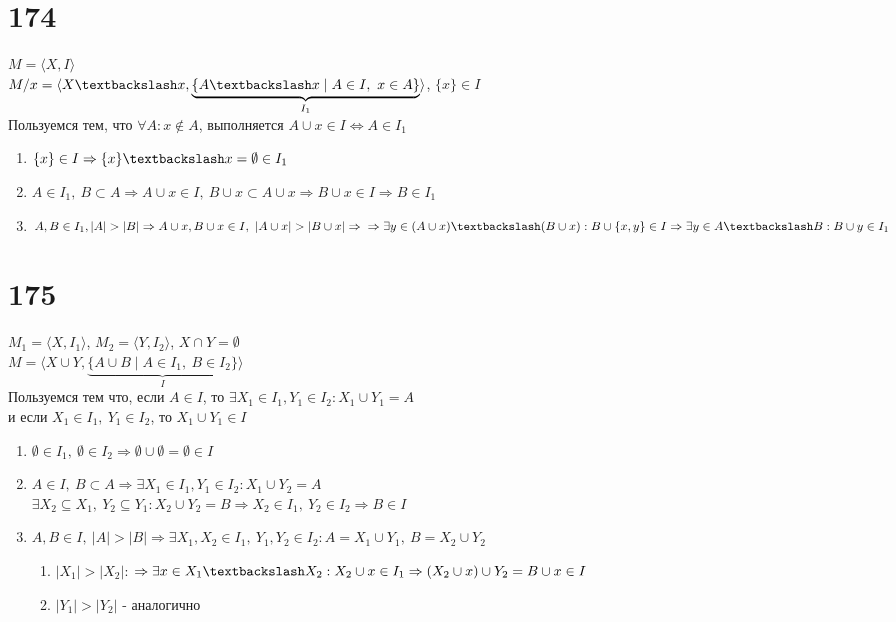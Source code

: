 \documentclass{article}
\begin{document}
\section*{174}
\label{sec:org257c497}
\(M = \langle X, I \rangle\) \\
\(M / x = \langle X\textbackslash x, \underbrace{\{ A \textbackslash x \mid A \in I,\ x \in A \}}_{I_1} \rangle\), \(\{x\} \in I\) \\
Пользуемся тем, что \(\forall A : x \not\in A\), выполняется \(A\cup x \in I \Leftrightarrow A \in I_1\)
\begin{enumerate}
\item \(\{x\} \in I \Rightarrow \{x\} \textbackslash x = \emptyset \in I_1\)
\item \(A \in I_1,\ B \subset A \Rightarrow A \cup x \in I,\ B\cup x \subset A\cup x \Rightarrow B\cup x \in I \Rightarrow B \in I_1\)
\item \(A, B \in I_1, |A| > |B| \Rightarrow A\cup x, B\cup x \in I,\ |A\cup x| > |B\cup x| \Rightarrow \\ \Rightarrow \exists y \in (A\cup x) \textbackslash (B\cup x) : B\cup \{x, y\} \in I \Rightarrow \exists y \in A \textbackslash B : B \cup y \in I_1\)
\end{enumerate}
\section*{175}
\label{sec:orgf69b2e4}
\(M_1 = \langle X, I_1 \rangle\), \(M_2 = \langle Y, I_2 \rangle\), \(X \cap Y = \emptyset\) \\
\(M = \langle X \cup Y, \underbrace{\{A \cup B \mid A \in I_1,\ B \in I_2\}}_{I} \rangle\) \\
Пользуемся тем что, если \(A \in I\), то \(\exists X_1 \in I_1, Y_1 \in I_2 : X_1 \cup Y_1 = A\) \\
и если \(X_1 \in I_1,\ Y_1 \in I_2\), то \(X_1 \cup Y_1 \in I\) \\
\begin{enumerate}
\item \(\emptyset \in I_1,\ \emptyset \in I_2 \Rightarrow \emptyset \cup \emptyset = \emptyset \in I\)
\item \(A \in I,\ B \subset A \Rightarrow \exists X_1 \in I_1, Y_1 \in I_2 : X_1 \cup Y_2 = A\) \\
\(\exists X_2 \subseteq X_1,\ Y_2 \subseteq Y_1 : X_2 \cup Y_2 = B \Rightarrow X_2 \in I_1,\ Y_2 \in I_2 \Rightarrow B \in I\)
\item \(A, B \in I,\ |A| > |B| \Rightarrow \exists X_1, X_2 \in I_1,\ Y_1,Y_2 \in I_2: A = X_1 \cup Y_1,\ B = X_2 \cup Y_2\)
\begin{enumerate}
\item \(|X_1| > |X_2|\):
\(\Rightarrow \exists x \in X_1 \textbackslash X_2: X_2 \cup x \in I_1 \Rightarrow (X_2 \cup x) \cup Y_2 = B \cup x \in I\)
\item \(|Y_1| > |Y_2|\) - аналогично
\end{enumerate}
\end{enumerate}
\end{document}
